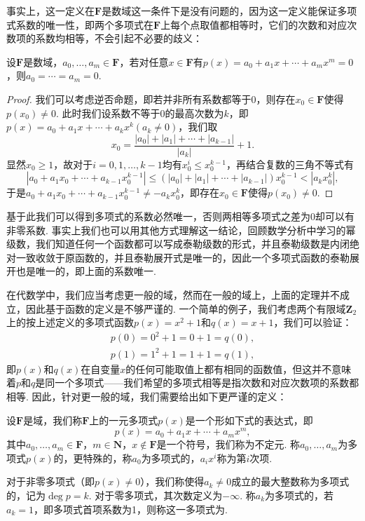 事实上，这一定义在$\mathbf{F}$是数域这一条件下是没有问题的，因为这一定义能保证多项式系数的唯一性，即两个多项式在$\mathbf{F}$上每个点取值都相等时，它们的次数和对应次数项的系数均相等，不会引起不必要的歧义：
\begin{theorem}
    设$\mathbf{F}$是数域，$a_0,\ldots,a_m\in\mathbf{F}$，若对任意$x\in\mathbf{F}$有$p(x)=a_0+a_1x+\cdots+a_mx^m=0$，则$a_0=\cdots=a_m=0$.
\end{theorem}
\begin{proof}
    我们可以考虑逆否命题，即若并非所有系数都等于$0$，则存在$x_0\in\mathbf{F}$使得$p(x_0)\neq 0$. 此时我们设系数不等于$0$的最高次数为$k$，即$p(x)=a_0+a_1x+\cdots+a_kx^k(a_k\neq 0)$，我们取
    \[x_0=\dfrac{|a_0|+|a_1|+\cdots+|a_{k-1}|}{|a_k|}+1.\]
    显然$x_0\geqslant 1$，故对于$i=0,1,\ldots,k-1$均有$x_0^i\leqslant x_0^{k-1}$，再结合复数的三角不等式有
    \[|a_0+a_1x_0+\cdots+a_{k-1}x_0^{k-1}|\leqslant(|a_0|+|a_1|+\cdots+|a_{k-1}|)x_0^{k-1}<|a_kx_0^k|,\]
    于是$a_0+a_1x_0+\cdots+a_{k-1}x_0^{k-1}\neq -a_kx_0^k$，即存在$x_0\in\mathbf{F}$使得$p(x_0)\neq 0$.
\end{proof}
基于此我们可以得到多项式的系数必然唯一，否则两相等多项式之差为$0$却可以有非零系数. 事实上我们也可以用其他方式理解这一结论，回顾数学分析中学习的幂级数，我们知道任何一个函数都可以写成泰勒级数的形式，并且泰勒级数是内闭绝对一致收敛于原函数的，并且泰勒展开式是唯一的，因此一个多项式函数的泰勒展开也是唯一的，即上面的系数唯一.

在代数学中，我们应当考虑更一般的域，然而在一般的域上，上面的定理并不成立，因此基于函数的定义是不够严谨的. 一个简单的例子，我们考虑两个有限域$\mathbf{Z}_2$上的按上述定义的多项式函数$p(x)=x^2+1$和$q(x)=x+1$，我们可以验证：
\begin{gather*}
    p(0)=0^2+1=0+1=q(0),\\
    p(1)=1^2+1=1+1=q(1),
\end{gather*}
即$p(x)$和$q(x)$在自变量$x$的任何可能取值上都有相同的函数值，但这并不意味着$p$和$q$是同一个多项式——我们希望的多项式相等是指次数和对应次数项的系数都相等. 因此，针对更一般的域，我们需要给出如下更严谨的定义：
\begin{definition}[一般域上的一元多项式]
    设$\mathbf{F}$是域，我们称$\mathbf{F}$上的一元多项式$p(x)$是一个形如下式的表达式，即
    \begin{equation} \label{eq:17:多项式定义}
        p(x)=a_0+a_1x+\cdots+a_mx^m,
    \end{equation}
    其中$a_0,\ldots,a_m\in\mathbf{F}$，$m\in\mathbf{N}$，$x\notin \mathbf{F}$是一个符号，我们称为不定元. 称$a_0,\ldots,a_m$为多项式$p(x)$的，更特殊的，称$a_0$为多项式的，$a_ix^i$称为第$i$次项.

    对于非零多项式（即$p(x)\neq 0$），我们称使得$a_k\neq 0$成立的最大整数称为多项式的，记为$\deg p=k$. 对于零多项式，其次数定义为$-\infty$. 称$a_k$为多项式的，若$a_k=1$，即多项式首项系数为1，则称这一多项式为.
\end{definition}

